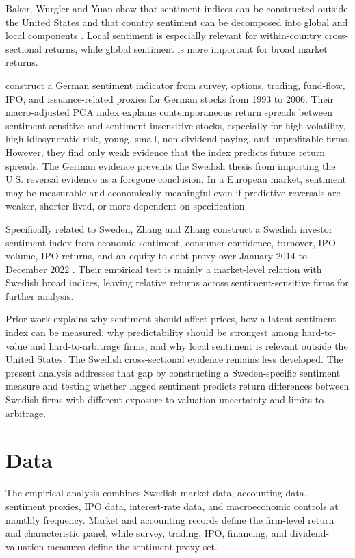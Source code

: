 \documentclass[11pt]{article}
\begin{document}
Baker, Wurgler and Yuan show that sentiment indices can be constructed outside the United States and that country sentiment can be decomposed into global and local components \citep{baker2012global}. Local sentiment is especially relevant for within-country cross-sectional returns, while global sentiment is more important for broad market returns. 

\citet{finter2012german} construct a German sentiment indicator from survey, options, trading, fund-flow, IPO, and issuance-related proxies for German stocks from 1993 to 2006. Their macro-adjusted PCA index explains contemporaneous return spreads between sentiment-sensitive and sentiment-insensitive stocks, especially for high-volatility, high-idiosyncratic-risk, young, small, non-dividend-paying, and unprofitable firms. However, they find only weak evidence that the index predicts future return spreads. The German evidence prevents the Swedish thesis from importing the U.S. reversal evidence as a foregone conclusion. In a European market, sentiment may be measurable and economically meaningful even if predictive reversals are weaker, shorter-lived, or more dependent on specification.

Specifically related to Sweden, Zhang and Zhang construct a Swedish investor sentiment index from economic sentiment, consumer confidence, turnover, IPO volume, IPO returns, and an equity-to-debt proxy over January 2014 to December 2022 \citep{zhang2023sweden}. Their empirical test is mainly a market-level relation with Swedish broad indices, leaving relative returns across sentiment-sensitive firms for further analysis.

Prior work explains why sentiment should affect prices, how a latent sentiment index can be measured, why predictability should be strongest among hard-to-value and hard-to-arbitrage firms, and why local sentiment is relevant outside the United States. The Swedish cross-sectional evidence remains less developed. The present analysis addresses that gap by constructing a Sweden-specific sentiment measure and testing whether lagged sentiment predicts return differences between Swedish firms with different exposure to valuation uncertainty and limits to arbitrage.

\section{Data}
The empirical analysis combines Swedish market data, accounting data, sentiment proxies, IPO data, interest-rate data, and macroeconomic controls at monthly frequency. Market and accounting records define the firm-level return and characteristic panel, while survey, trading, IPO, financing, and dividend-valuation measures define the sentiment proxy set.
\end{document}
